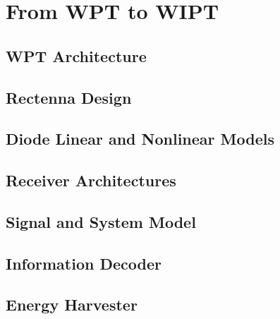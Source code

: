 \chapter{From WPT to WIPT}



\section{WPT Architecture}\label{sec:wpt-architecture}
  

\section{Rectenna Design}\label{sec:rectenna-design}
  

\section{Diode Linear and Nonlinear Models}\label{sec:diode-characteristics}
  

\section{Receiver Architectures}\label{sec:receiver-architectures}
  

\section{Signal and System Model}\label{sec:signal-and-system-model}
  

\section{Information Decoder}\label{sec:information-decoder}
  

\section{Energy Harvester}\label{sec:energy-harvester}
   